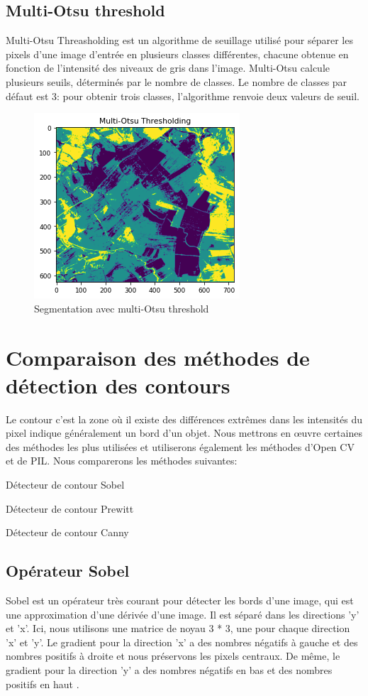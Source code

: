 \documentclass[12pt, openany]{report}
\begin{document}
\subsection{Multi-Otsu threshold}
Multi-Otsu Threasholding est un algorithme de seuillage utilisé pour séparer les pixels d'une image d'entrée en plusieurs classes différentes, chacune obtenue en fonction de l'intensité des niveaux de gris dans l'image.
Multi-Otsu calcule plusieurs seuils, déterminés par le nombre de classes. Le nombre de classes par défaut est 3: pour obtenir trois classes, l'algorithme renvoie deux valeurs de seuil.

\begin{figure}[ht]
\centering
\includegraphics[scale=0.9]{osupng.png}
\caption{Segmentation avec multi-Otsu threshold}
\end{figure}

\section{Comparaison des méthodes de détection des contours}
Le contour c’est la zone où il existe des différences extrêmes dans les intensités du pixel indique généralement un bord d'un objet.
Nous mettrons en œuvre certaines des méthodes les plus utilisées et utiliserons également les méthodes d'Open CV et de PIL.\cite{comparaison}
\noindent Nous comparerons les méthodes suivantes:
\begin{mylist}
\item Détecteur de contour Sobel
\item Détecteur de contour Prewitt
\item Détecteur de contour Canny
\end{mylist}

\subsection{Opérateur Sobel}
Sobel est un opérateur très courant pour détecter les bords d'une image, qui est une approximation d'une dérivée d'une image. Il est séparé dans les directions 'y' et 'x'. Ici, nous utilisons une matrice de noyau 3 * 3, une pour chaque direction 'x' et 'y'. Le gradient pour la direction 'x' a des nombres négatifs à gauche et des nombres positifs à droite et nous préservons les pixels centraux. De même, le gradient pour la direction 'y' a des nombres négatifs en bas et des nombres positifs en haut .
\end{document}
